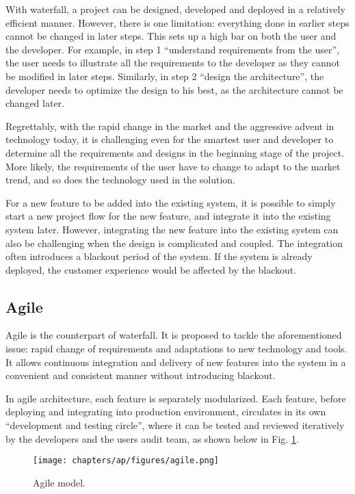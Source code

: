 With waterfall, a project can be designed, developed and deployed in a relatively efficient manner. However, there is one limitation: everything done in earlier steps cannot be changed in later steps. This sets up a high bar on both the user and the developer. For example, in step 1 ``understand requirements from the user'', the user needs to illustrate all the requirements to the developer as they cannot be modified in later steps. Similarly, in step 2 ``design the architecture'', the developer needs to optimize the design to his best, as the architecture cannot be changed later.

Regrettably, with the rapid change in the market and the aggressive advent in technology today, it is challenging even for the smartest user and developer to determine all the requirements and designs in the beginning stage of the project. More likely, the requirements of the user have to change to adapt to the market trend, and so does the technology used in the solution.

For a new feature to be added into the existing system, it is possible to simply start a new project flow for the new feature, and integrate it into the existing system later. However, integrating the new feature into the existing system can also be challenging when the design is complicated and coupled. The integration often introduces a blackout period of the system. If the system is already deployed, the customer experience would be affected by the blackout.

\subsection{Agile}

Agile is the counterpart of waterfall. It is proposed to tackle the aforementioned issue: rapid change of requirements and adaptations to new technology and tools. It allows continuous integration and delivery of new features into the system in a convenient and consistent manner without introducing blackout.

In agile architecture, each feature is separately modularized. Each feature, before deploying and integrating into production environment, circulates in its own ``development and testing circle'', where it can be tested and reviewed iteratively by the developers and the users audit team, as shown below in Fig. \ref{ch:cicd:fig:agile}.
\begin{figure}[htbp]
	\centering
	\texttt{[image: chapters/ap/figures/agile.png]}
	\caption{Agile model.} \label{ch:cicd:fig:agile}
\end{figure}

